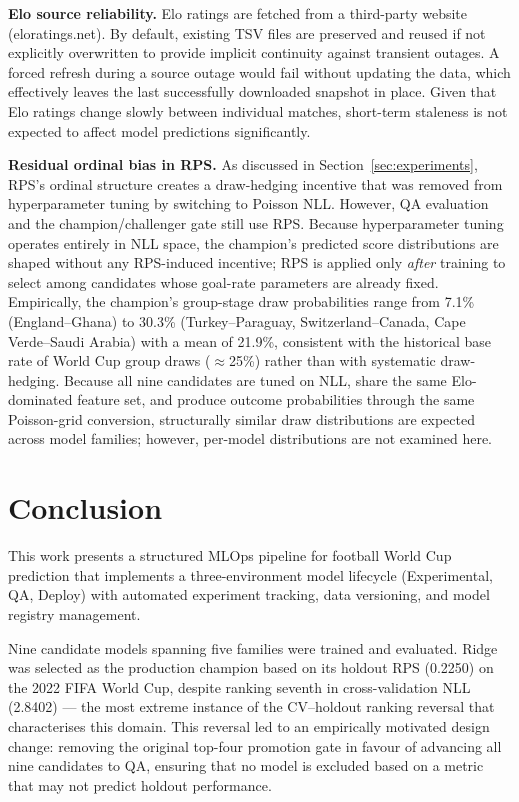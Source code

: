 \documentclass[conference]{IEEEtran}
\begin{document}
\textbf{Elo source reliability.}
Elo ratings are fetched from a third-party website (eloratings.net). By default, existing TSV 
files are preserved and reused if not explicitly overwritten to provide implicit continuity against 
transient outages. A forced refresh during a source outage would fail without updating the data, 
which effectively leaves the last successfully downloaded snapshot in place. Given that Elo ratings 
change slowly between individual matches, short-term staleness is not expected to affect model predictions significantly.

\textbf{Residual ordinal bias in RPS.}
As discussed in Section~\ref{sec:experiments}, RPS's ordinal structure creates a
draw-hedging incentive that was removed from hyperparameter tuning by switching to
Poisson NLL. However, QA evaluation and the champion/challenger gate still use RPS.
Because hyperparameter tuning operates entirely in NLL space, the champion's
predicted score distributions are shaped without any RPS-induced incentive;
RPS is applied only \emph{after} training to select among candidates whose
goal-rate parameters are already fixed. Empirically, the champion's
group-stage draw probabilities range from 7.1\% (England--Ghana) to 30.3\%
(Turkey--Paraguay, Switzerland--Canada, Cape Verde--Saudi Arabia) with a
mean of 21.9\%, consistent with the historical base rate of World Cup group
draws ($\approx$25\%) rather than with systematic draw-hedging.
Because all nine candidates are tuned on NLL, share the same Elo-dominated
feature set, and produce outcome probabilities through the same Poisson-grid
conversion, structurally similar draw distributions are expected across model
families; however, per-model distributions are not examined here.

\section{Conclusion}
\label{sec:conclusion}

This work presents a structured MLOps pipeline for football World Cup prediction
that implements a three-environment model lifecycle (Experimental, QA, Deploy)
with automated experiment tracking, data versioning, and model registry
management.

Nine candidate models spanning five families were trained and evaluated.
Ridge was selected as the production champion based on its holdout RPS
(0.2250) on the 2022 FIFA World Cup, despite ranking seventh in
cross-validation NLL (2.8402) --- the most extreme instance of the
CV--holdout ranking reversal that characterises this domain.  This reversal
led to an empirically motivated design change: removing the original
top-four promotion gate in favour of advancing all nine candidates to QA,
ensuring that no model is excluded based on a metric that may not predict
holdout performance.
\end{document}
